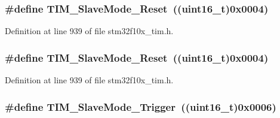 \subsubsection[{\texorpdfstring{T\+I\+M\+\_\+\+Slave\+Mode\+\_\+\+Reset}{TIM_SlaveMode_Reset}}]{\setlength{\rightskip}{0pt plus 5cm}\#define T\+I\+M\+\_\+\+Slave\+Mode\+\_\+\+Reset~(({\bf uint16\+\_\+t})0x0004)}\hypertarget{group___t_i_m___slave___mode_gaac1cec731f1a5e680a038c4f472f74af}{}\label{group___t_i_m___slave___mode_gaac1cec731f1a5e680a038c4f472f74af}


Definition at line 939 of file stm32f10x\+\_\+tim.\+h.

\subsubsection[{\texorpdfstring{T\+I\+M\+\_\+\+Slave\+Mode\+\_\+\+Reset}{TIM_SlaveMode_Reset}}]{\setlength{\rightskip}{0pt plus 5cm}\#define T\+I\+M\+\_\+\+Slave\+Mode\+\_\+\+Reset~(({\bf uint16\+\_\+t})0x0004)}\hypertarget{group___t_i_m___slave___mode_gaac1cec731f1a5e680a038c4f472f74af}{}\label{group___t_i_m___slave___mode_gaac1cec731f1a5e680a038c4f472f74af}


Definition at line 939 of file stm32f10x\+\_\+tim.\+h.

\subsubsection[{\texorpdfstring{T\+I\+M\+\_\+\+Slave\+Mode\+\_\+\+Trigger}{TIM_SlaveMode_Trigger}}]{\setlength{\rightskip}{0pt plus 5cm}\#define T\+I\+M\+\_\+\+Slave\+Mode\+\_\+\+Trigger~(({\bf uint16\+\_\+t})0x0006)}\hypertarget{group___t_i_m___slave___mode_ga9e7726c04ee1bafec97226f08adf5677}{}\label{group___t_i_m___slave___mode_ga9e7726c04ee1bafec97226f08adf5677}


